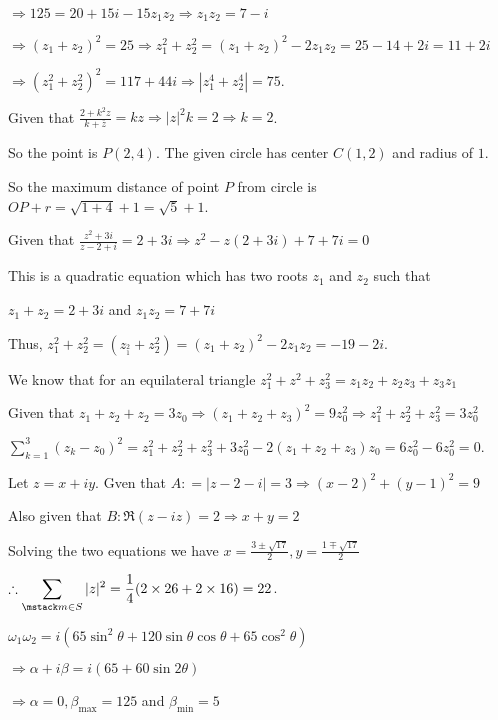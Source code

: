   $\Rightarrow 125 = 20 + 15i - 15z_1z_2 \Rightarrow z_1z_2 = 7 - i$

  $\Rightarrow (z_1 + z_2)^2 = 25\Rightarrow z_1^2 + z_2^2 = (z_1 + z_2)^2 - 2z_1z_2 = 25 - 14 + 2i = 11 +
  2i$

  $\Rightarrow \left(z_1^2 + z_2^2\right)^2 = 117 + 44i \Rightarrow \left|z_1^4 + z_2^4\right| = 75$.
\item Given that $\frac{2 + k^2z}{k + \overline{z}} = kz\Rightarrow |z|^2k = 2 \Rightarrow k = 2$.

  So the point is $P(2, 4)$. The given circle has center $C(1, 2)$ and radius of $1$.

  So the maximum distance of point $P$ from circle is $OP + r = \sqrt{1 + 4} + 1 = \sqrt{5} + 1$.
\item Given that $\frac{z^2 + 3i}{z - 2 + i} = 2 + 3i\Rightarrow z^2 - z(2 + 3i) + 7 + 7i = 0$

  This is a quadratic equation which has two roots $z_1$ and $z_2$ such that

  $z_1 + z_2 = 2 + 3i$ and $z_1z_2 = 7 + 7i$

  Thus, $z_1^2 + z_2^2 = \left(z__1^2 + z_2^2\right) = \left(z_1 + z_2\right)^2 - 2z_1z_2 = -19 -2i$.
\item We know that for an equilateral triangle $z_1^2 + z^2 + z_3^2 = z_1z_2 + z_2z_3 + z_3z_1$

  Given that $z_1 + z_2 + z_2 = 3z_0 \Rightarrow \left(z_1 + z_2 + z_3\right)^2 = 9z_0^2 \Rightarrow z_1^2 +
  z_2^2 + z_3^2 = 3z_0^2$

  $\displaystyle\sum_{k = 1}^3\left(z_k - z_0\right)^2 = z_1^2 + z_2^2 + z_3^2 + 3z_0^2 - 2\left(z_1 + z_2 +
  z_3\right)z_0 = 6z_0^2 - 6z_0^2 = 0$.
\item Let $z = x + iy$. Gven that $A: = |z - 2 - i| = 3\Rightarrow (x - 2)^2 + (y - 1)^2 = 9$

  Also given that $B: \Re(z - iz) = 2 \Rightarrow x + y = 2$

  Solving the two equations we have $x = \frac{3\pm \sqrt{17}}{2}, y = \frac{1\mp\sqrt{17}}{2}$

  $\therefore \displaystyle\sum_{\mstack m\in S} |z|^2 = \frac{1}{4}(2\times 26 + 2\times 16) = 22$.
\item $\omega_1\omega_2 = i\left(65\sin^2\theta + 120\sin\theta\cos\theta + 65\cos^2\theta\right)$

  $\Rightarrow \alpha +i\beta = i(65 + 60\sin2\theta)$

  $\Rightarrow \alpha = 0, \beta_{\max} = 125$ and $\beta_{\min} = 5$

